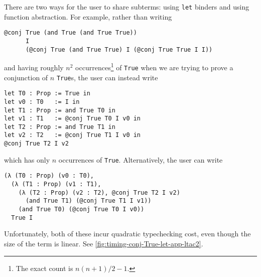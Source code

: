 There are two ways for the user to share subterms: using \texttt{let} binders and using function abstraction.
For example, rather than writing
\begin{verbatim}
@conj True (and True (and True True))
      I
      (@conj True (and True True) I (@conj True True I I))
\end{verbatim}
and having roughly $n^2$ occurrences\footnote{The exact count is $n(n+1)/2 - 1$.} of \texttt{True} when we are trying to prove a conjunction of $n$ \texttt{True}s, the user can instead write
\begin{verbatim}
let T0 : Prop := True in
let v0 : T0   := I in
let T1 : Prop := and True T0 in
let v1 : T1   := @conj True T0 I v0 in
let T2 : Prop := and True T1 in
let v2 : T2   := @conj True T1 I v0 in
@conj True T2 I v2
\end{verbatim}
which has only $n$ occurrences of \texttt{True}.
Alternatively, the user can write
\begin{verbatim}
(λ (T0 : Prop) (v0 : T0),
  (λ (T1 : Prop) (v1 : T1),
    (λ (T2 : Prop) (v2 : T2), @conj True T2 I v2)
      (and True T1) (@conj True T1 I v1))
    (and True T0) (@conj True T0 I v0))
  True I
\end{verbatim}

Unfortunately, both of these incur quadratic typechecking cost, even though the size of the term is linear.
See \autoref{fig:timing-conj-True-let-app-ltac2}.
%

